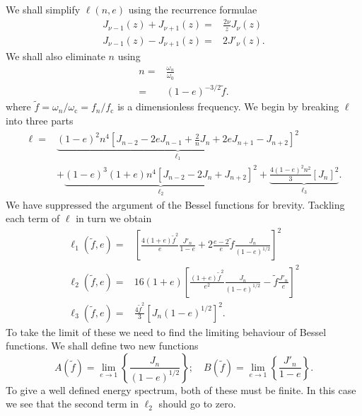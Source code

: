 \documentclass[a4paper, 11pt, titlepage, twoside]{report}
\newcommand{\sub}[1]{\ensuremath{_\mathrm{#1}}}
\begin{document}
{We shall simplify $\ell(n,e)$ using the recurrence formulae\cite{Watson1995}
\begin{align}
J_{\nu-1}(z) + J_{\nu+1}(z) = {} & \frac{2\nu}{z}J_\nu(z)\\
J_{\nu-1}(z) - J_{\nu+1}(z) = {} & 2J'_\nu(z).
\end{align}
We shall also eliminate $n$ using
\begin{align}
n = {} & \frac{\omega_n}{\omega_0} \nonumber \\
= {} & (1-e)^{-3/2}\widetilde{f}.
\end{align}
where $\widetilde{f} = \omega_n/\omega\sub{c} = f_n/f\sub{c}$ is a dimensionless frequency. We begin by breaking $\ell$ into three parts
\begin{align}
\ell = {} & \underbrace{(1-e)^2n^4\left[J_{n-2} - 2eJ_{n-1} + \frac{2}{n}J_n + 2eJ_{n+1} - J_{n+2}\right]^2}_{\ell_1} \nonumber \\
  & + \underbrace{(1-e)^3(1+e)n^4\left[J_{n-2} - 2J_n + J_{n+2}\right]^2}_{\ell_2} + \underbrace{\frac{4(1-e)^2n^2}{3}\left[J_n\right]^2}_{\ell_3}.
\end{align}
We have suppressed the argument of the Bessel functions for brevity. Tackling each term of $\ell$ in turn we obtain
\begin{align}
\ell_1(\widetilde{f},e) = {} & \left[\frac{4(1+e)\widetilde{f}^2}{e}\frac{J'_n}{1-e} + 2\frac{e-2}{e}\widetilde{f}\frac{J_n}{(1-e)^{1/2}}\right]^2\\
\ell_2(\widetilde{f},e) = {} & 16(1+e)\left[\frac{(1+e)\widetilde{f}^2}{e^2}\frac{J_n}{(1-e)^{1/2}} - \widetilde{f}\frac{J'_n}{e}\right]^2\\
\ell_3(\widetilde{f},e) = {} & \frac{4\widetilde{f}^2}{3}\left[{J_n}{(1-e)^{1/2}}\right]^2.
\end{align}
To take the limit of these we need to find the limiting behaviour of Bessel functions. We shall define two new functions
\begin{equation}
A(\widetilde{f}) = \lim_{e\rightarrow 1}\left\{\frac{J_n}{(1-e)^{1/2}}\right\}; \quad B(\widetilde{f}) = \lim_{e\rightarrow 1}\left\{\frac{J'_n}{1-e}\right\}.
\end{equation}
To give a well defined energy spectrum, both of these must be finite. In this case we see that the second term in $\ell_2$ should go to zero.

}
\end{document}
